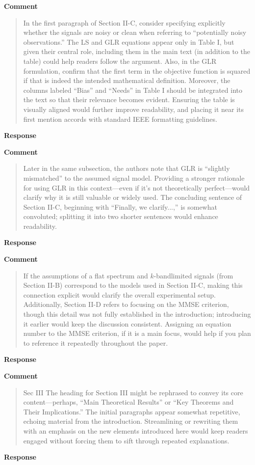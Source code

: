 \documentclass[11pt,onecolumn,journal]{IEEEtran}
\begin{document}
\textbf{Comment}
\begin{quote}

In the first paragraph of Section II-C, consider specifying explicitly whether the signals are noisy or clean when referring to “potentially noisy observations.” The LS and GLR equations appear only in Table I, but given their central role, including them in the main text (in addition to the table) could help readers follow the argument. Also, in the GLR formulation, confirm that the first term in the objective function is squared if that is indeed the intended mathematical definition. Moreover, the columns labeled “Bias” and “Needs” in Table I should be integrated into the text so that their relevance becomes evident. Ensuring the table is visually aligned would further improve readability, and placing it near its first mention accords with standard IEEE formatting guidelines.

\end{quote}
\textbf{Response}


\textbf{Comment}
\begin{quote}
Later in the same subsection, the authors note that GLR is “slightly mismatched” to the assumed signal model. Providing a stronger rationale for using GLR in this context—even if it’s not theoretically perfect—would clarify why it is still valuable or widely used. The concluding sentence of Section II-C, beginning with “Finally, we clarify...,” is somewhat convoluted; splitting it into two shorter sentences would enhance readability.

\end{quote}
\textbf{Response}


\textbf{Comment}
\begin{quote}
If the assumptions of a flat spectrum and $k$-bandlimited signals (from Section II-B) correspond to the models used in Section II-C, making this connection explicit would clarify the overall experimental setup. Additionally, Section II-D refers to focusing on the MMSE criterion, though this detail was not fully established in the introduction; introducing it earlier would keep the discussion consistent. Assigning an equation number to the MMSE criterion, if it is a main focus, would help if you plan to reference it repeatedly throughout the paper.

\end{quote}
\textbf{Response}


\textbf{Comment}
\begin{quote}
Sec III
The heading for Section III might be rephrased to convey its core content—perhaps, “Main Theoretical Results” or “Key Theorems and Their Implications.” The initial paragraphs appear somewhat repetitive, echoing material from the introduction. Streamlining or rewriting them with an emphasis on the new elements introduced here would keep readers engaged without forcing them to sift through repeated explanations.

\end{quote}
\textbf{Response}
\end{document}
